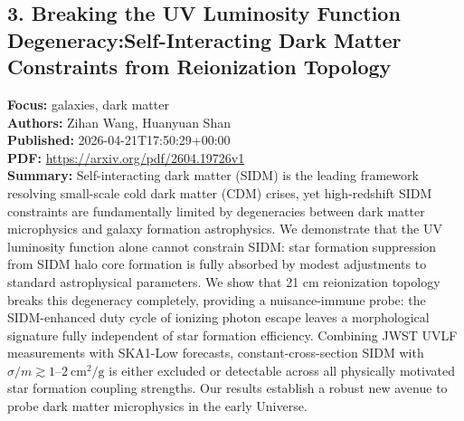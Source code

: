 \documentclass[11pt]{article}
\begin{document}
\subsection*{3. Breaking the UV Luminosity Function Degeneracy:Self-Interacting Dark Matter Constraints from Reionization Topology}
\textbf{Focus:} galaxies, dark matter\\
\textbf{Authors:} Zihan Wang, Huanyuan Shan\\
\textbf{Published:} 2026-04-21T17:50:29+00:00\\
\textbf{PDF:} \href{https://arxiv.org/pdf/2604.19726v1}{https://arxiv.org/pdf/2604.19726v1}\\
\textbf{Summary:}
Self-interacting dark matter (SIDM) is the leading framework resolving small-scale cold dark matter (CDM) crises, yet high-redshift SIDM constraints are fundamentally limited by degeneracies between dark matter microphysics and galaxy formation astrophysics. We demonstrate that the UV luminosity function alone cannot constrain SIDM: star formation suppression from SIDM halo core formation is fully absorbed by modest adjustments to standard astrophysical parameters. We show that 21 cm reionization topology breaks this degeneracy completely, providing a nuisance-immune probe: the SIDM-enhanced duty cycle of ionizing photon escape leaves a morphological signature fully independent of star formation efficiency. Combining JWST UVLF measurements with SKA1-Low forecasts, constant-cross-section SIDM with $\sigma /m \gtrsim 1$--$2\ \mathrm{cm^2/g}$ is either excluded or detectable across all physically motivated star formation coupling strengths. Our results establish a robust new avenue to probe dark matter microphysics in the early Universe.
\newpage
\end{document}
